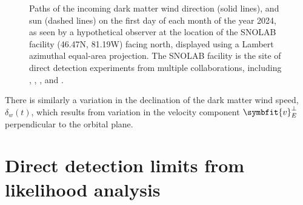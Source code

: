 \documentclass[b5paper, 10pt, twoside]{book}
\renewcommand{\vec}[1]{\symbfit{#1}}
\newcommand{\unitv}[1]{\symbfit{\hat{#1}}}
\begin{document}
\begin{figure}
\caption{Paths of the incoming dark matter wind direction (solid lines), and sun (dashed lines) on the first day of each month of the year 2024, as seen by a hypothetical observer at the location of the SNOLAB facility (46.47\degree N, 81.19\degree W) facing north, displayed using a Lambert azimuthal equal-area projection. The SNOLAB facility is the site of direct detection experiments from multiple collaborations, including \textcite{DEAP2016}, \textcite{PICO2016}, \textcite{SuperCDMS2017}, and \textcite{DAMIC2020}.}
\label{fig:v-lab-dir}
\end{figure}

There is similarly a variation in the declination of the dark matter wind speed, $\delta_w(t)$, which results from variation in the velocity component $\vec{v}_E^\perp$ perpendicular to the orbital plane.

\chapter{Direct detection limits from likelihood analysis}
\end{document}
